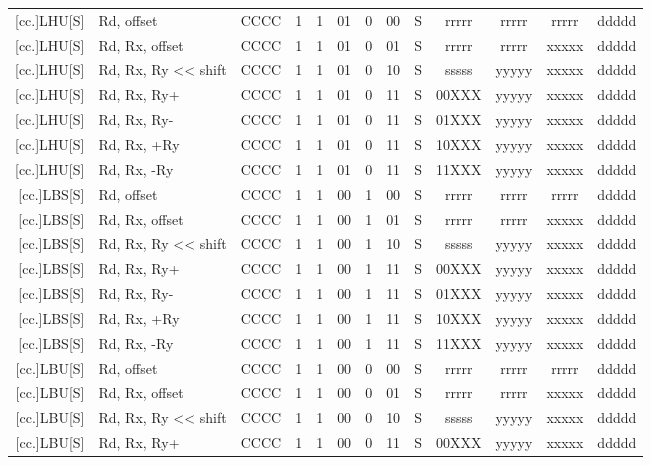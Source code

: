 \documentclass{article}
\begin{document}
\begin{longtable}{|r|l|c|c|c|c|c|c|c|ccc|c|}
        \hline %
        {[}cc.]LHU[S] & Rd, offset & CCCC & 1 & 1 & 01 & 0 & 00 & S & rrrrr & rrrrr & rrrrr & ddddd \\
        {[}cc.]LHU[S] & Rd, Rx, offset & CCCC & 1 & 1 & 01 & 0 & 01 & S & rrrrr & rrrrr & xxxxx & ddddd \\
        {[}cc.]LHU[S] & Rd, Rx, Ry << shift & CCCC & 1 & 1 & 01 & 0 & 10 & S & sssss & yyyyy & xxxxx & ddddd \\
        {[}cc.]LHU[S] & Rd, Rx, Ry+ & CCCC & 1 & 1 & 01 & 0 & 11 & S & 00XXX & yyyyy & xxxxx & ddddd \\
        {[}cc.]LHU[S] & Rd, Rx, Ry- & CCCC & 1 & 1 & 01 & 0 & 11 & S & 01XXX & yyyyy & xxxxx & ddddd \\
        {[}cc.]LHU[S] & Rd, Rx, +Ry & CCCC & 1 & 1 & 01 & 0 & 11 & S & 10XXX & yyyyy & xxxxx & ddddd \\
        {[}cc.]LHU[S] & Rd, Rx, -Ry & CCCC & 1 & 1 & 01 & 0 & 11 & S & 11XXX & yyyyy & xxxxx & ddddd \\
        \hline %
        \pagebreak
        {[}cc.]LBS[S] & Rd, offset & CCCC & 1 & 1 & 00 & 1 & 00 & S & rrrrr & rrrrr & rrrrr & ddddd \\
        {[}cc.]LBS[S] & Rd, Rx, offset & CCCC & 1 & 1 & 00 & 1 & 01 & S & rrrrr & rrrrr & xxxxx & ddddd \\
        {[}cc.]LBS[S] & Rd, Rx, Ry << shift & CCCC & 1 & 1 & 00 & 1 & 10 & S & sssss & yyyyy & xxxxx & ddddd \\
        {[}cc.]LBS[S] & Rd, Rx, Ry+ & CCCC & 1 & 1 & 00 & 1 & 11 & S & 00XXX & yyyyy & xxxxx & ddddd \\
        {[}cc.]LBS[S] & Rd, Rx, Ry- & CCCC & 1 & 1 & 00 & 1 & 11 & S & 01XXX & yyyyy & xxxxx & ddddd \\
        {[}cc.]LBS[S] & Rd, Rx, +Ry & CCCC & 1 & 1 & 00 & 1 & 11 & S & 10XXX & yyyyy & xxxxx & ddddd \\
        {[}cc.]LBS[S] & Rd, Rx, -Ry & CCCC & 1 & 1 & 00 & 1 & 11 & S & 11XXX & yyyyy & xxxxx & ddddd \\
        \hline %
        {[}cc.]LBU[S] & Rd, offset & CCCC & 1 & 1 & 00 & 0 & 00 & S & rrrrr & rrrrr & rrrrr & ddddd \\
        {[}cc.]LBU[S] & Rd, Rx, offset & CCCC & 1 & 1 & 00 & 0 & 01 & S & rrrrr & rrrrr & xxxxx & ddddd \\
        {[}cc.]LBU[S] & Rd, Rx, Ry << shift & CCCC & 1 & 1 & 00 & 0 & 10 & S & sssss & yyyyy & xxxxx & ddddd \\
        {[}cc.]LBU[S] & Rd, Rx, Ry+ & CCCC & 1 & 1 & 00 & 0 & 11 & S & 00XXX & yyyyy & xxxxx & ddddd \\

\end{longtable}
\end{document}

